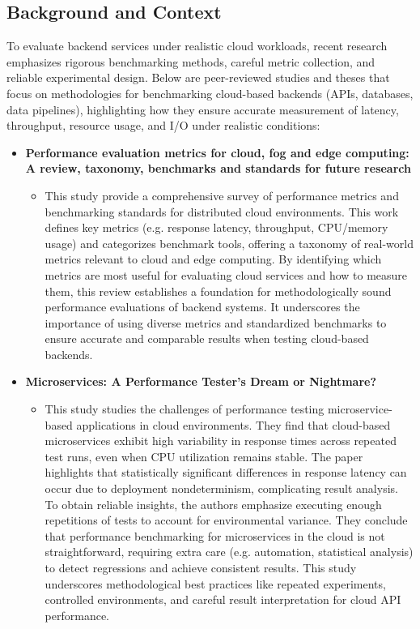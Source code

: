 \documentclass[11pt]{article}
\begin{document}
\subsection*{Background and Context}
To evaluate backend services under realistic cloud workloads, recent research emphasizes rigorous benchmarking methods, careful metric collection, and reliable experimental design. Below are peer-reviewed studies and theses that focus on methodologies for benchmarking cloud-based backends (APIs, databases, data pipelines), highlighting how they ensure accurate measurement of latency, throughput, resource usage, and I/O under realistic conditions:

\begin{itemize}
    \item[] \textbf{Performance evaluation metrics for cloud, fog and edge computing: A review, taxonomy, benchmarks and standards for future research}
    \begin{itemize}
        \item[] This study provide a comprehensive survey of performance metrics and benchmarking standards for distributed cloud environments. This work defines key metrics (e.g. response latency, throughput, CPU/memory usage) and categorizes benchmark tools, offering a taxonomy of real-world metrics relevant to cloud and edge computing. By identifying which metrics are most useful for evaluating cloud services and how to measure them, this review establishes a foundation for methodologically sound performance evaluations of backend systems. It underscores the importance of using diverse metrics and standardized benchmarks to ensure accurate and comparable results when testing cloud-based backends.
    \end{itemize}
    \item[] \textbf{Microservices: A Performance Tester’s Dream or Nightmare?}
    \begin{itemize}
        \item[] This study studies the challenges of performance testing microservice-based applications in cloud environments. They find that cloud-based microservices exhibit high variability in response times across repeated test runs, even when CPU utilization remains stable. The paper highlights that statistically significant differences in response latency can occur due to deployment nondeterminism, complicating result analysis. To obtain reliable insights, the authors emphasize executing enough repetitions of tests to account for environmental variance. They conclude that performance benchmarking for microservices in the cloud is not straightforward, requiring extra care (e.g. automation, statistical analysis) to detect regressions and achieve consistent results. This study underscores methodological best practices like repeated experiments, controlled environments, and careful result interpretation for cloud API performance.

\end{itemize}
\end{itemize}
\end{document}

